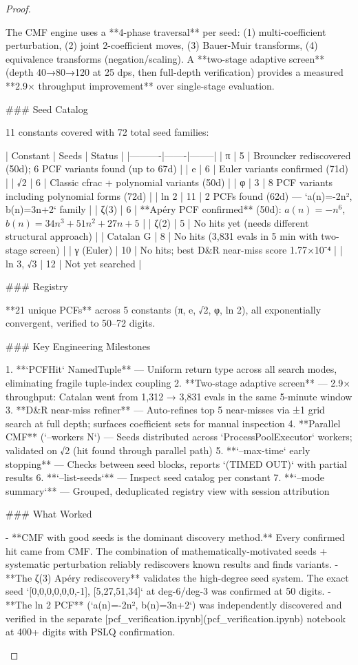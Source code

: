 \begin{theorem}
\begin{lemma}
\begin{proposition}
\begin{corollary}
\begin{proof}
\begin{remark}
The CMF engine uses a **4-phase traversal** per seed: (1) multi-coefficient perturbation, (2) joint 2-coefficient moves, (3) Bauer-Muir transforms, (4) equivalence transforms (negation/scaling). A **two-stage adaptive screen** (depth 40→80→120 at 25 dps, then full-depth verification) provides a measured **2.9× throughput improvement** over single-stage evaluation.

### Seed Catalog

11 constants covered with 72 total seed families:

| Constant | Seeds | Status |
|----------|-------|--------|
| π | 5 | Brouncker rediscovered (50d); 6 PCF variants found (up to 67d) |
| e | 6 | Euler variants confirmed (71d) |
| √2 | 6 | Classic cfrac + polynomial variants (50d) |
| φ | 3 | 8 PCF variants including polynomial forms (72d) |
| ln 2 | 11 | 2 PCFs found (62d) — `a(n)=-2n², b(n)=3n+2` family |
| ζ(3) | 6 | **Apéry PCF confirmed** (50d): $a(n)=-n^6$, $b(n)=34n^3+51n^2+27n+5$ |
| ζ(2) | 5 | No hits yet (needs different structural approach) |
| Catalan G | 8 | No hits (3,831 evals in 5 min with two-stage screen) |
| γ (Euler) | 10 | No hits; best D&R near-miss score 1.77×10⁻⁴ |
| ln 3, √3 | 12 | Not yet searched |

### Registry

**21 unique PCFs** across 5 constants (π, e, √2, φ, ln 2), all exponentially convergent, verified to 50–72 digits.

### Key Engineering Milestones

1. **`PCFHit` NamedTuple** — Uniform return type across all search modes, eliminating fragile tuple-index coupling
2. **Two-stage adaptive screen** — 2.9× throughput: Catalan went from 1,312 → 3,831 evals in the same 5-minute window
3. **D&R near-miss refiner** — Auto-refines top 5 near-misses via ±1 grid search at full depth; surfaces coefficient sets for manual inspection
4. **Parallel CMF** (`--workers N`) — Seeds distributed across `ProcessPoolExecutor` workers; validated on √2 (hit found through parallel path)
5. **`--max-time` early stopping** — Checks between seed blocks, reports `(TIMED OUT)` with partial results
6. **`--list-seeds`** — Inspect seed catalog per constant
7. **`--mode summary`** — Grouped, deduplicated registry view with session attribution

### What Worked

- **CMF with good seeds is the dominant discovery method.** Every confirmed hit came from CMF. The combination of mathematically-motivated seeds + systematic perturbation reliably rediscovers known results and finds variants.
- **The ζ(3) Apéry rediscovery** validates the high-degree seed system. The exact seed `[0,0,0,0,0,0,-1], [5,27,51,34]` at deg-6/deg-3 was confirmed at 50 digits.
- **The ln 2 PCF** (`a(n)=-2n², b(n)=3n+2`) was independently discovered and verified in the separate [pcf_verification.ipynb](pcf_verification.ipynb) notebook at 400+ digits with PSLQ confirmation.


\end{remark}
\end{proof}
\end{corollary}
\end{proposition}
\end{lemma}
\end{theorem}

